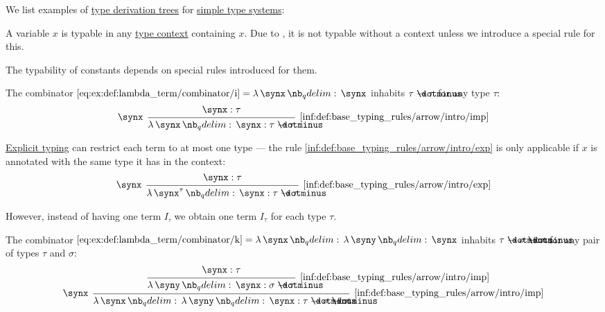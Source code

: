 \begin{example}\label{ex:def:type_derivation_tree}
  We list examples of \hyperref[def:type_derivation_tree]{type derivation trees} for \hyperref[def:simple_type_system]{simple type systems}:
  \begin{thmenum}
     A variable \( x \) is typable in any \hyperref[def:type_context]{type context} containing \( x \). Due to , it is not typable without a context unless we introduce a special rule for this.

     The typability of constants depends on special rules introduced for them.

     The combinator \( \ref{eq:ex:def:lambda_term/combinator/i} = \qabs \synx \synx \) inhabits \( \tau \synimplies \tau \) for any type \( \tau \):
    \begin{equation*}
      \begin{prooftree}
        \hypo{ \synx: \tau }
        \infer[left label=\( \synx \)]1[\ref{inf:def:base_typing_rules/arrow/intro/imp}]{ \qabs \synx \synx: \tau \synimplies \tau }
      \end{prooftree}
    \end{equation*}

    \hyperref[def:simple_type_system_style]{Explicit typing} can restrict each term to at most one type --- the rule \ref{inf:def:base_typing_rules/arrow/intro/exp} is only applicable if \( x \) is annotated with the same type it has in the context:
    \begin{equation*}
      \begin{prooftree}
        \hypo{ \synx: \tau }
        \infer[left label=\( \synx \)]1[\ref{inf:def:base_typing_rules/arrow/intro/exp}]{ \qabs {\synx^\tau} \synx: \tau \synimplies \tau }
      \end{prooftree}
    \end{equation*}

    However, instead of having one term \( I \), we obtain one term \( I_\tau \) for each type \( \tau \).

     The combinator \( \ref{eq:ex:def:lambda_term/combinator/k} = \qabs \synx \qabs \syny \synx \) inhabits \( \tau \synimplies \sigma \synimplies \tau \) for any pair of types \( \tau \) and \( \sigma \):
    \begin{equation*}
      \begin{prooftree}
        \hypo{ \synx: \tau }
        \infer1[\ref{inf:def:base_typing_rules/arrow/intro/imp}]{ \qabs \syny \synx: \sigma \synimplies \tau }
        \infer[left label=\( \synx \)]1[\ref{inf:def:base_typing_rules/arrow/intro/imp}]{ \qabs \synx \qabs \syny \synx: \tau \synimplies \sigma \synimplies \tau }
      \end{prooftree}
    \end{equation*}


\end{thmenum}
\end{example}
